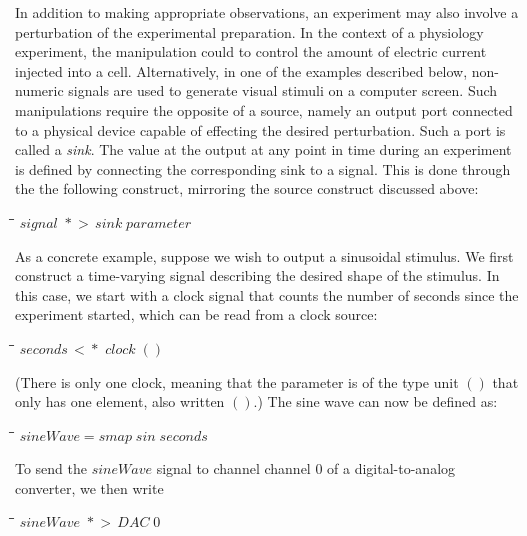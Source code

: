 \documentclass[11pt]{article}
\newlength{\lwidth}\setlength{\lwidth}{4.5cm}
\newlength{\cwidth}\setlength{\cwidth}{8mm} %
\newcommand{\Conid}[1]{\mathit{#1}}
\newcommand{\Varid}[1]{\mathit{#1}}
\begin{document}
In addition to making appropriate observations, an experiment may also
involve a perturbation of the experimental preparation. In the context
of a physiology experiment, the manipulation could to control the
amount of electric current injected into a cell. Alternatively, in one
of the examples described below, non-numeric signals are used to
generate visual stimuli on a computer screen. Such manipulations
require the opposite of a source, namely an output port connected to a
physical device capable of effecting the desired perturbation. Such
a port is called a \emph{sink}. The value at the output at any point
in time during an experiment is defined by connecting the
corresponding sink to a signal.  This is done through the the
following construct, mirroring the source construct discussed above:
\begin{tabbing}
\qquad\=\hspace{\lwidth}\=\hspace{\cwidth}\=\+\kill
${\Varid{signal}\,\,*\!\!\!>\,\Varid{sink}\;\Varid{parameter}}$
\end{tabbing}{}

As a concrete example, suppose we wish to output a sinusoidal stimulus. We
first construct a time-varying signal describing the desired shape of the
stimulus. In this case, we start with a clock signal that counts the number of
seconds since the experiment started, which can be read from a clock source:
\begin{tabbing}
\qquad\=\hspace{\lwidth}\=\hspace{\cwidth}\=\+\kill
${\Varid{seconds}\,<\!\!\!*\,\,\Varid{clock}\;()}$
\end{tabbing}(There is only one clock, meaning that the parameter is of the type unit \ensuremath{()}
that only has one element, also written \ensuremath{()}.) The sine wave can now be
defined as:
\begin{tabbing}
\qquad\=\hspace{\lwidth}\=\hspace{\cwidth}\=\+\kill
${\Varid{sineWave}\mathrel{=}\Varid{smap}\;\Varid{sin}\;\Varid{seconds}}$
\end{tabbing}To send the \ensuremath{\Varid{sineWave}} signal to channel channel 0 of a digital-to-analog
converter, we then write
\begin{tabbing}
\qquad\=\hspace{\lwidth}\=\hspace{\cwidth}\=\+\kill
${\Varid{sineWave}\,\,*\!\!\!>\,\Conid{DAC}\;\mathrm{0}}$
\end{tabbing}{}
\end{document}
